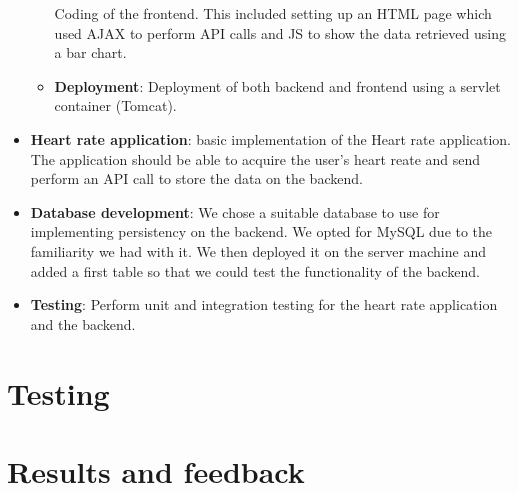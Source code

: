 \begin{itemize}
\begin{itemize}
			Coding of the frontend. This included setting up an HTML page which used
			AJAX to perform API calls and JS to show the data retrieved using a bar chart.
		\item \textbf{Deployment}:
			Deployment of both backend and frontend using a servlet container (Tomcat).
	\end{itemize}
	\item \textbf{Heart rate application}:
		basic implementation of the Heart rate application. The application should be able to acquire
		the user's heart reate and send perform an API call to store the data on the backend.
	\item \textbf{Database development}:
		We chose a suitable database to use for implementing persistency on the backend.
		We opted for MySQL due to the familiarity we had with it. We then deployed it on the server machine
		and added a first table so that we could test the functionality of the backend.
	\item \textbf{Testing}:
		Perform unit and integration testing for the heart rate application and the backend.
\end{itemize}

\section{Testing}

\section{Results and feedback}

